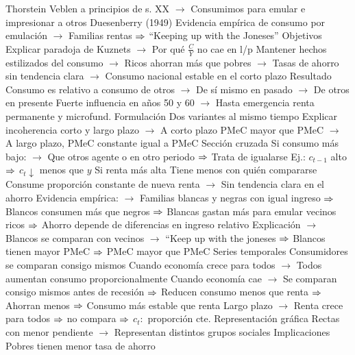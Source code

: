 \documentclass{nuevotema}
\begin{document}
\begin{esquemal}
				\4[] Thorstein Veblen a principios de s. XX
				\4[] $\to$ Consumimos para emular e impresionar a otros
				\4[] Duesenberry (1949)
				\4[] Evidencia empírica de consumo por emulación
				\4[] $\to$ Familias rentas
				\4[] $\Rightarrow$ ``Keeping up with the Joneses''
				\4 Objetivos
				\4[] Explicar paradoja de Kuznets
				\4[] $\to$ Por qué $\frac{C}{Y}$ no cae en l/p
				\4[] Mantener hechos estilizados del consumo
				\4[] $\to$ Ricos ahorran más que pobres
				\4[] $\to$ Tasas de ahorro sin tendencia clara
				\4[] $\to$ Consumo nacional estable en el corto plazo
				\4 Resultado
				\4[] Consumo es relativo a consumo de otros
				\4[] $\to$ De sí mismo en pasado
				\4[] $\to$ De otros en presente
				\4[] Fuerte influencia en años 50 y 60
				\4[] $\to$ Hasta emergencia renta permanente y microfund.
			\3 Formulación
				\4 Dos variantes al mismo tiempo
				\4[] Explicar incoherencia corto y largo plazo
				\4[] $\to$ A corto plazo PMeC mayor que PMeC
				\4[] $\to$ A largo plazo, PMeC constante igual a PMeC
				\4 Sección cruzada
				\4[] Si consumo más bajo:
				\4[] $\to$ Que otros agente o en otro periodo
				\4[] $\Rightarrow$ Trata de igualarse
				\4[] Ej.: $c_{t-1}$ alto
				\4[] $\Rightarrow$ $c_{t} \downarrow$ menos que $y$
				\4[] Si renta más alta
				\4[] Tiene menos con quién compararse
				\4[] Consume proporción constante de nueva renta
				\4[] $\to$ Sin tendencia clara en el ahorro
				\4[] Evidencia empírica:
				\4[] $\to$ Familias blancas y negras con igual ingreso
				\4[] $\Rightarrow$ Blancos consumen más que negros
				\4[] $\Rightarrow$ Blancas gastan más para emular vecinos ricos
				\4[] $\Rightarrow$ Ahorro depende de diferencias en ingreso relativo
				\4[] Explicación
				\4[] $\to$ Blancos se comparan con vecinos
				\4[] $\to$ ``Keep up with the joneses
				\4[] $\Rightarrow$ Blancos tienen mayor PMeC
				\4[] $\Rightarrow$ PMeC mayor que PMeC
				\4 Series temporales
				\4[] Consumidores se comparan consigo mismos
				\4[] Cuando economía crece para todos
				\4[] $\to$ Todos aumentan consumo proporcionalmente
				\4[] Cuando economía cae
				\4[] $\to$ Se comparan consigo mismos antes de recesión
				\4[] $\Rightarrow$ Reducen consumo menos que renta
				\4[] $\Rightarrow$ Ahorran menos
				\4[] $\Rightarrow$ Consumo más estable que renta
				\4[] Largo plazo
				\4[] $\to$ Renta crece para todos
				\4[] $\Rightarrow$ no compara
				\4[] $\Rightarrow$ $c_t:$ proporción cte.
				\4 Representación gráfica
				\4[] Rectas con menor pendiente
				\4[] $\to$ Representan distintos grupos sociales
				\4[] 
			\3 Implicaciones
				\4 Pobres tienen menor tasa de ahorro

\end{esquemal}
\end{document}
